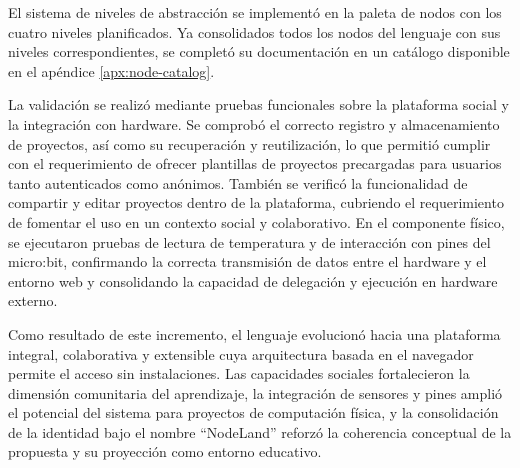 El sistema de niveles de abstracción se implementó en la paleta de nodos con los cuatro niveles planificados. Ya consolidados todos los nodos del lenguaje con sus niveles correspondientes, se completó su documentación en un catálogo disponible en el apéndice \ref{apx:node-catalog}.

La validación se realizó mediante pruebas funcionales sobre la plataforma social y la integración con hardware. Se comprobó el correcto registro y almacenamiento de proyectos, así como su recuperación y reutilización, lo que permitió cumplir con el requerimiento de ofrecer plantillas de proyectos precargadas para usuarios tanto autenticados como anónimos. También se verificó la funcionalidad de compartir y editar proyectos dentro de la plataforma, cubriendo el requerimiento de fomentar el uso en un contexto social y colaborativo. En el componente físico, se ejecutaron pruebas de lectura de temperatura y de interacción con pines del micro:bit, confirmando la correcta transmisión de datos entre el hardware y el entorno web y consolidando la capacidad de delegación y ejecución en hardware externo.

Como resultado de este incremento, el lenguaje evolucionó hacia una plataforma integral, colaborativa y extensible cuya arquitectura basada en el navegador permite el acceso sin instalaciones. Las capacidades sociales fortalecieron la dimensión comunitaria del aprendizaje, la integración de sensores y pines amplió el potencial del sistema para proyectos de computación física, y la consolidación de la identidad bajo el nombre ``NodeLand'' reforzó la coherencia conceptual de la propuesta y su proyección como entorno educativo.